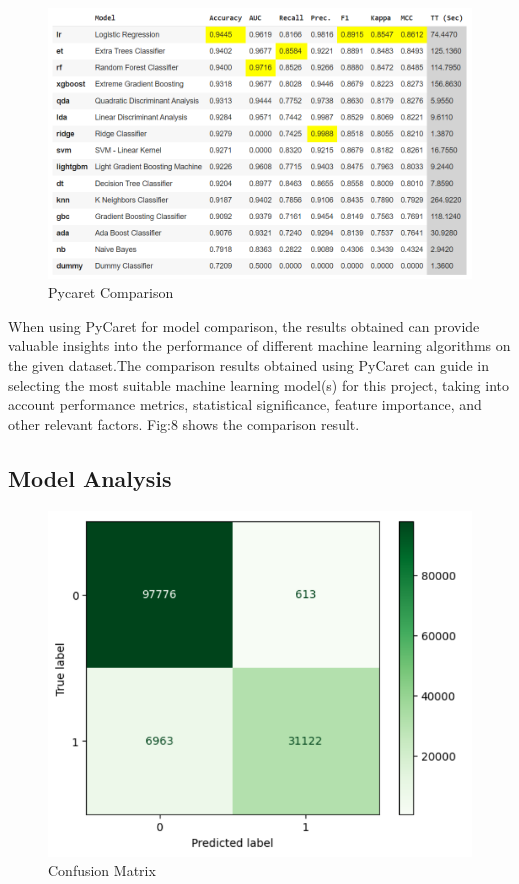 \documentclass[conference]{IEEEtran}
\begin{document}
\begin{figure}[H]
\centerline{\includegraphics[scale=0.35]{pycaretCheck.png}}
\caption{Pycaret Comparison}
\label{fig}
\end{figure}

\par When using PyCaret for model comparison, the results obtained can provide valuable insights into the performance of different machine learning algorithms on the given dataset.The comparison results obtained using PyCaret can guide in selecting the most suitable machine learning model(s) for this project, taking into account performance metrics, statistical significance, feature importance, and other relevant factors. Fig:8 shows the comparison result.
\subsection{Model Analysis}
\begin{figure}[H]
\centerline{\includegraphics[scale=0.5]{greenCN.png}}
\caption{Confusion Matrix}
\label{fig}
\end{figure}
\end{document}
